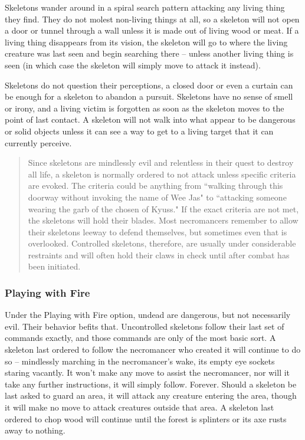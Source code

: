 Skeletons wander around in a spiral search pattern attacking any living thing they find. They do not molest non-living things at all, so a skeleton will not open a door or tunnel through a wall unless it is made out of living wood or meat. If a living thing disappears from its vision, the skeleton will go to where the living creature was last seen and begin searching there -- unless another living thing is seen (in which case the skeleton will simply move to attack it instead).

Skeletons do not question their perceptions, a closed door or even a curtain can be enough for a skeleton to abandon a pursuit. Skeletons have no sense of smell or irony, and a living victim is forgotten as soon as the skeleton moves to the point of last contact. A skeleton will not walk into what appear to be dangerous or solid objects unless it can see a way to get to a living target that it can currently perceive.

\begin{quote}

Since skeletons are mindlessly evil and relentless in their quest to destroy all life, a skeleton is normally ordered to not attack unless specific criteria are evoked. The criteria could be anything from ``walking through this doorway without invoking the name of Wee Jas" to ``attacking someone wearing the garb of the chosen of Kyuss." If the exact criteria are not met, the skeletons will hold their blades. Most necromancers remember to allow their skeletons leeway to defend themselves, but sometimes even that is overlooked. Controlled skeletons, therefore, are usually under considerable restraints and will often hold their claws in check until after combat has been initiated.
\end{quote}

\subsubsection{Playing with Fire}

Under the Playing with Fire option, undead are dangerous, but not necessarily evil. Their behavior befits that. Uncontrolled skeletons follow their last set of commands exactly, and those commands are only of the most basic sort. A skeleton last ordered to follow the necromancer who created it will continue to do so -- mindlessly marching in the necromancer's wake, its empty eye sockets staring vacantly. It won't make any move to assist the necromancer, nor will it take any further instructions, it will simply follow. Forever. Should a skeleton be last asked to guard an area, it will attack any creature entering the area, though it will make no move to attack creatures outside that area. A skeleton last ordered to chop wood will continue until the forest is splinters or its axe rusts away to nothing.

